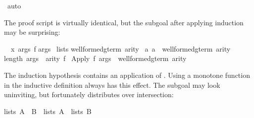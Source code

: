 \begin{isabellebody}
\isamarkupfalse%
\ auto\isanewline
{}\isamarkupfalse%
%
\endisatagproof
{\isafoldproof}%
%
\isadelimproof
%
\endisadelimproof
%
\isadelimproof
%
\endisadelimproof
%
\isatagproof
%
\begin{isamarkuptxt}%
The proof script is virtually identical,
but the subgoal after applying induction may be surprising:
\begin{isabelle}%
\ {}{}\ {}x\ args\ f{}\isanewline
{}args\isanewline
{}\ lists\isanewline
{}well{}formed{}gterm{}\ arity\ {}\isanewline
{}a{}\ a\ {}\ well{}formed{}gterm\ arity{}{}{}\isanewline
{}length\ args\ {}\ arity\ f{}\isanewline
{}\ Apply\ f\ args\ {}\ well{}formed{}gterm\ arity%
\end{isabelle}
The induction hypothesis contains an application of .  Using a
monotone function in the inductive definition always has this effect.  The
subgoal may look uninviting, but fortunately 
 distributes over intersection:
\begin{isabelle}%
lists\ {}A\ {}\ B{}\ {}\ lists\ A\ {}\ lists\ B%

\end{isabelle}
\end{isamarkuptxt}
\end{isabellebody}
